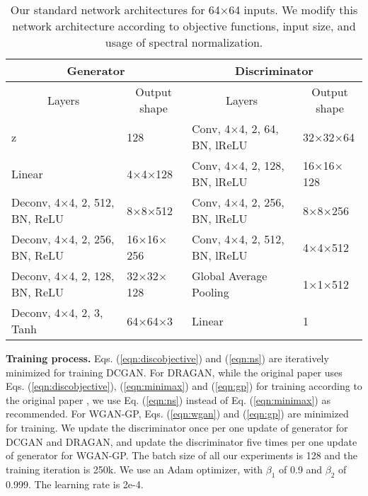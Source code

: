 \documentclass[runningheads]{llncs}
\begin{document}
\begin{table}[t!]
\centering
\caption{Our standard network architectures for 64$\times$64 inputs. We modify this network architecture according to objective functions, input size, and usage of spectral normalization.}
\label{tab:architecture}
\begin{scriptsize}
\begin{tabular}{@{}llll@{}}
\toprule
\multicolumn{2}{c}{Generator}                                           & \multicolumn{2}{c}{Discriminator}                                      \\ \midrule
\multicolumn{1}{c}{Layers}           & \multicolumn{1}{c}{Output shape} & \multicolumn{1}{c}{Layers}          & \multicolumn{1}{c}{Output shape} \\ \midrule
z                                    & 128                              & Conv, 4$\times$4, 2, 64, BN, lReLU  & 32$\times$32$\times$64           \\ \midrule
Linear                               & 4$\times$4$\times$128            & Conv, 4$\times$4, 2, 128, BN, lReLU & 16$\times$16$\times$128          \\ \midrule
Deconv, 4$\times$4, 2, 512, BN, ReLU & 8$\times$8$\times$512            & Conv, 4$\times$4, 2, 256, BN, lReLU & 8$\times$8$\times$256            \\ \midrule
Deconv, 4$\times$4, 2, 256, BN, ReLU & 16$\times$16$\times$256          & Conv, 4$\times$4, 2, 512, BN, lReLU & 4$\times$4$\times$512            \\ \midrule
Deconv, 4$\times$4, 2, 128, BN, ReLU & 32$\times$32$\times$128          & Global Average Pooling              & 1$\times$1$\times$512            \\ \midrule
Deconv, 4$\times$4, 2, 3, Tanh       & 64$\times$64$\times$3            & Linear                              & 1                                \\ \bottomrule
\end{tabular}
\end{scriptsize}
\end{table}


\noindent\textbf{Training process.} Eqs. (\ref{eqn:discobjective}) and (\ref{eqn:ns}) are iteratively minimized for training DCGAN. For DRAGAN, while the original paper uses Eqs. (\ref{eqn:discobjective}), (\ref{eqn:minimax}) and (\ref{eqn:gp}) for training according to the original paper \cite{kodali2017dragan}, we use Eq. (\ref{eqn:ns}) instead of Eq. (\ref{eqn:minimax}) as \cite{fedus2017many} recommended. For WGAN-GP, Eqs. (\ref{eqn:wgan}) and (\ref{eqn:gp}) are minimized for training. We update the discriminator once per one update of generator for DCGAN and DRAGAN, and update the discriminator five times per one update of generator for WGAN-GP. The batch size of all our experiments is 128 and the training iteration is 250k. We use an Adam optimizer, with $\beta_{1}$ of 0.9 and $\beta_{2}$ of 0.999. The learning rate is 2e-4.
\end{document}
